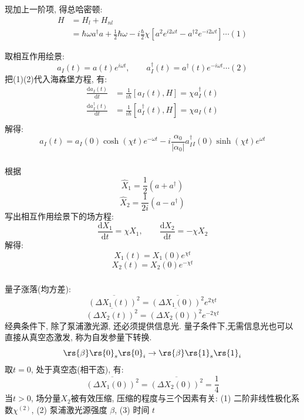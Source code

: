 \begin{frame}
      \frametitle{}
      
现加上一阶项, 得总哈密顿: 
     \[ 
       \begin{aligned}
           H & = H_l + H_{nl} \\ 
           &= \hbar \omega a ^{\dagger } a  + \frac{1}{2}\hbar \omega  - i \frac{\hbar}{2} \chi [ a^2 e ^{i 2 \omega t} -  a ^{\dagger 2} e ^{-i 2 \omega t}]  \cdots  (1) 
           \end{aligned} \]

 取相互作用绘景: 
 \[ a_I(t) = a(t) e ^{i \omega t},  \qquad a^\dagger _I(t) = a^\dagger (t) e ^{-i \omega t} \cdots  (2)\] 
 把(1)(2)代入海森堡方程, 有: 
 \[ 
    \begin{aligned}
        \frac{\mathrm{d}a_I(t)}{\mathrm{d}t} & = \frac{1}{i \hbar} [a_I(t), H ] = \chi a^\dagger _I(t)  \\ 
        \frac{\mathrm{d}a^\dagger _I(t)}{\mathrm{d}t} & = \frac{1}{i \hbar} [a^\dagger _I(t), H ] = \chi a_I(t)  \\
    \end{aligned} \]
    解得: 
    \[ a_I(t) = a_I(0) \cosh(\chi t )e^{-\omega t} - i \frac{\alpha_0}{\left|\alpha_0\right|} a_I^\dagger_I(0) \sinh(\chi t ) e^{\omega t}\]
\end{frame}   

\begin{frame}
 \frametitle{}
 根据  \[ \hat{X}_{1} =\frac{1}{2}\left(a + a^{\dagger}\right)\]
 \[ \hat{X}_{2} = \frac{1}{2 i}\left(a - a^{\dagger}\right)\]
写出相互作用绘景下的场方程: 
\[ \frac{\mathrm{d}X_1}{\mathrm{d}t} =  \chi X_1 , \qquad  \frac{\mathrm{d}X_2}{\mathrm{d}t} = - \chi X_2  \]
解得: 
\[ X_1(t) = X_1 (0) e ^{\chi t}\]
\[ X_2(t) = X_2 (0) e ^{-\chi t}\]
\end{frame}

\begin{frame}
 \frametitle{}
    量子涨落(均方差): 
    \[\overline{(\Delta X_1(t))^2} = \overline{(\Delta X_1(0))^2}  e^{2\chi t}  \]
    \[\overline{(\Delta X_2(t))^2} = \overline{(\Delta X_2(0))^2}  e^{-2\chi t}  \]
    经典条件下, 除了泵浦激光源, 还必须提供信息光. 量子条件下,无需信息光也可以直接从真空态激发, 称为自发参量下转换. 
    \[ \rs{\beta} \rs{0}_s  \rs{0}_i \to \rs{\beta} \rs{1}_s  \rs{1}_i \]
    取$t=0$, 处于真空态(相干态), 有:
    \[\overline{(\Delta X_1(0))^2} = \overline{(\Delta X_2(0))^2} =\frac{1}{4}\]
    当$t>0$, 场分量$X_2$被有效压缩, 压缩的程度与三个因素有关: (1) 二阶非线性极化系数$\chi^{(2)}$, (2) 泵浦激光源强度 $\beta$,  (3) 时间 $t$ 
\end{frame}

